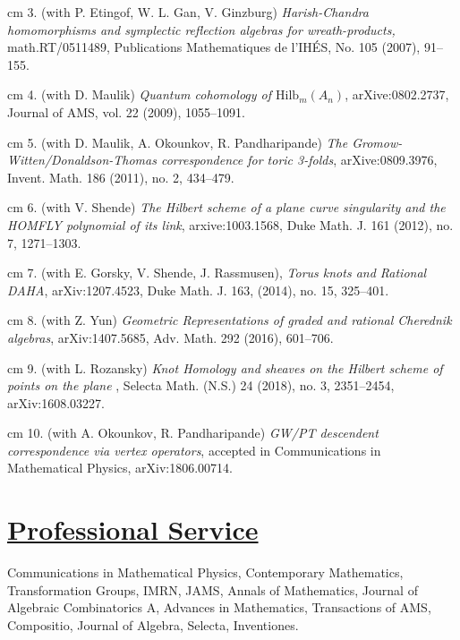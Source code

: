 \documentclass[11pt]{amsart}
\theoremstyle{plain}
\theoremstyle{definition}
\theoremstyle{remark}
\begin{document}
\noindent{} cm 3. (with P. Etingof, W. L. Gan, V. Ginzburg)
 {\it Ha\-rish-Cha\-n\-dra ho\-mo\-mor\-phisms and sym\-plec\-tic ref\-lec\-tion
algebras for wre\-ath-pro\-ducts,} math.RT/0511489, 
 Publications Mathematiques de l'IH\'ES,  No. 105  (2007), 91--155.


\noindent{} cm 4. (with D. Maulik) {\it Quantum cohomology of
$\mathrm{Hilb}_m(A_n)$}, arXive:0802.2737, Journal of AMS, vol. 22  (2009), 1055--1091. 

\noindent{} cm 5. (with D. Maulik, A. Okounkov, R. Pandharipande)
{\it The Gromow-Witten/Donaldson-Thomas correspondence for toric 3-folds},
arXive:0809.3976, Invent. Math. 186 (2011), no. 2, 434--479.

\noindent{} cm 6. (with V. Shende) 
{\it The Hilbert scheme of a plane curve singularity and the HOMFLY polynomial of its link}, arxive:1003.1568,
  Duke Math. J. 161 (2012), no. 7, 1271--1303.


\noindent{} cm 7. (with E. Gorsky, V. Shende, J. Rassmusen), {\it Torus knots and Rational DAHA},   arXiv:1207.4523,  Duke Math. J. 163, (2014), no. 15, 325--401. 

\noindent{} cm 8. (with Z. Yun) {\it Geometric Representations of graded and rational Cherednik algebras},   arXiv:1407.5685,
 Adv. Math. 292 (2016), 601--706.

\noindent{} cm 9. (with L. Rozansky) {\it Knot Homology and sheaves on the Hilbert scheme of points on the plane },
Selecta Math. (N.S.) 24 (2018), no. 3, 2351--2454,  arXiv:1608.03227.


\noindent{} cm 10. (with A. Okounkov, R. Pandharipande) {\it  GW/PT descendent correspondence via vertex operators},
accepted in Communications in Mathematical Physics, arXiv:1806.00714.





\section*{\Large \underline{Professional Service}}


\medskip

\medskip

 Communications in Mathematical Physics, Contemporary
Mathematics, Transformation Groups, IMRN, JAMS, Annals of Mathematics, Journal of Algebraic Combinatorics A, Advances in Mathematics, Transactions of AMS, Compositio, Journal of Algebra, Selecta, Inventiones.
\medskip  
\end{document}
